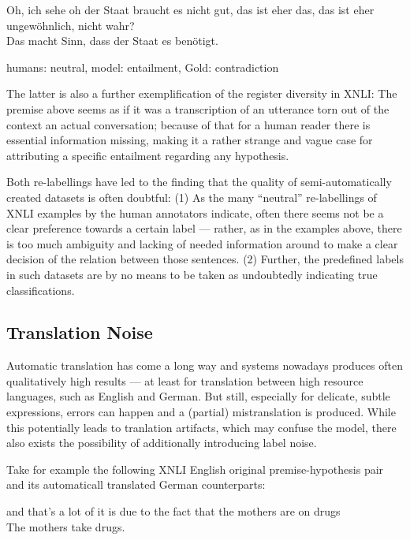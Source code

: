 {\begin{examples}
  \item Oh, ich sehe oh der Staat braucht es nicht gut, das ist eher das, das ist eher ungewöhnlich, nicht wahr?\\
        Das macht Sinn, dass der Staat es benötigt.

        humans: neutral, model: entailment, Gold: contradiction
\end{examples}

The latter is also a further exemplification of the register diversity in XNLI: The premise above seems as if it
was a transcription of an utterance torn out of the context an actual conversation; because of that for a human
reader there is essential information missing, making it a rather strange and vague case for attributing
a specific entailment regarding any hypothesis.


Both re-labellings have led to the finding that the quality of semi-automatically
created datasets is often doubtful: (1) As the many ``neutral'' re-labellings of
XNLI examples by the human annotators indicate, often there seems not be a clear
preference towards a certain label --- rather, as in the examples above, there is
too much ambiguity and lacking of needed information around to make a clear decision
of the relation between those sentences. (2) Further, the predefined labels in such
datasets are by no means to be taken as undoubtedly indicating true classifications.



\subsection{Translation Noise}
\label{sec:translation-noise}

Automatic translation has come a long way and systems nowadays produces often qualitatively high results ---
at least for translation between high resource languages, such as English and German.
But still, especially for delicate, subtle expressions, errors can happen and a (partial) mistranslation
is produced. While this potentially leads to tranlation artifacts, which may confuse the model, there
also exists the possibility of additionally introducing label noise.

Take for example the following XNLI English original premise-hypothesis pair and its automaticall
translated German counterparts:

\begin{examples}
  \item and that's a lot of it is due to the fact that the mothers are on drugs\\
        The mothers take drugs.


\end{examples}}
